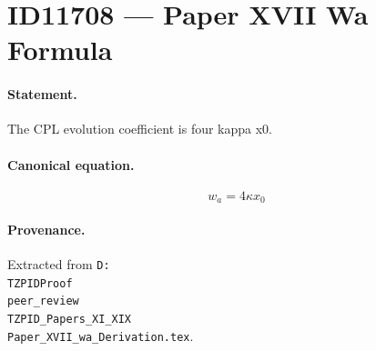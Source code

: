 \section*{ID11708 --- Paper XVII Wa Formula}

\paragraph{Statement.}
The CPL evolution coefficient is four kappa x0.

\paragraph{Canonical equation.}
\[
w_a=4\kappa x_0
\]

\paragraph{Provenance.}
Extracted from \texttt{D:\\TZPIDProof\\peer\_review\\TZPID\_Papers\_XI\_XIX\\Paper\_XVII\_wa\_Derivation.tex}.

